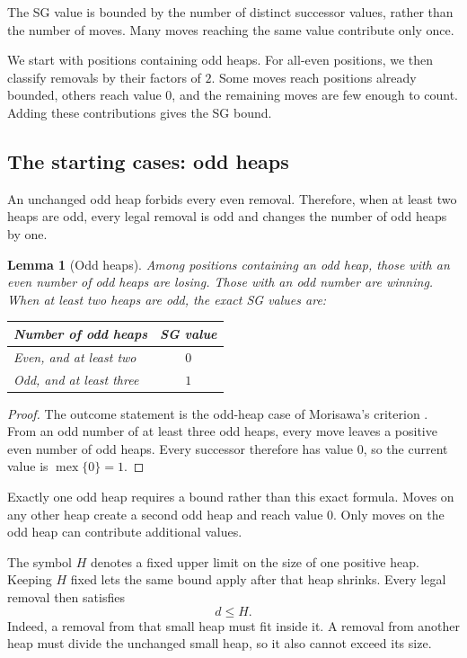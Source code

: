 \documentclass[10pt,a4paper]{article}
\newtheorem{lemma}[theorem]{Lemma}
\DeclareMathOperator{\mex}{mex}
\begin{document}
The SG value is bounded by the number of distinct successor
values, rather than the number of moves. Many moves reaching
the same value contribute only once.

We start with positions containing odd heaps. For all-even
positions, we then classify removals by their factors of $2$.
Some moves reach positions already bounded, others reach value
$0$, and the remaining moves are few enough to count. Adding
these contributions gives the SG bound.

\subsection{The starting cases: odd heaps}

An unchanged odd heap forbids every even removal. Therefore,
when at least two heaps are odd, every legal removal is odd
and changes the number of odd heaps by one.

\begin{lemma}[Odd heaps]
\label{lem:odd}
Among positions containing an odd heap, those with an even
number of odd heaps are losing. Those with an odd number are
winning. When at least two heaps are odd, the exact SG values are:
\begin{center}
\begin{tabularx}{0.9\linewidth}{@{}X c@{}}
\toprule
Number of odd heaps & SG value \\
\midrule
Even, and at least two & $0$ \\
Odd, and at least three & $1$ \\
\bottomrule
\end{tabularx}
\end{center}
\end{lemma}

\begin{proof}
The outcome statement is the odd-heap case of Morisawa's
criterion \cite[Theorem 2.2]{Morisawa2026}.
From an odd number of at least three odd heaps, every move
leaves a positive even number of odd heaps. Every successor
therefore has value $0$, so the current value is
$\mex\{0\}=1$.
\end{proof}

Exactly one odd heap requires a bound rather than this exact
formula. Moves on any other heap create a second odd heap and
reach value $0$. Only moves on the odd heap can contribute
additional values.

The symbol $H$ denotes a fixed upper limit on the size of one
positive heap. Keeping $H$ fixed lets the same bound apply after
that heap shrinks. Every legal removal then satisfies
\begin{equation}
 d\le H.
 \label{eq:smallremoval}
\end{equation}
Indeed, a removal from that small heap must fit inside it.
A removal from another heap must divide the unchanged small
heap, so it also cannot exceed its size.
\end{document}
